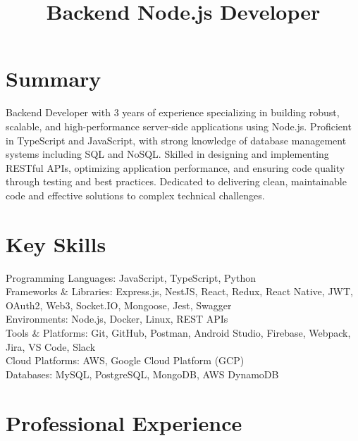 \documentclass[11pt,a4paper]{moderncv}
\title{Backend Node.js Developer}
\begin{document}
\maketitle

\section{Summary}

Backend Developer with 3 years of experience specializing in building robust, scalable, and high-performance server-side applications using Node.js. Proficient in TypeScript and JavaScript, with strong knowledge of database management systems including SQL and NoSQL. Skilled in designing and implementing RESTful APIs, optimizing application performance, and ensuring code quality through testing and best practices. Dedicated to delivering clean, maintainable code and effective solutions to complex technical challenges.

\section{Key Skills}

Programming Languages: JavaScript, TypeScript, Python\\
Frameworks \& Libraries: Express.js, NestJS, React, Redux, React Native, JWT, OAuth2, Web3, Socket.IO, Mongoose, Jest, Swagger\\
Environments: Node.js, Docker, Linux, REST APIs\\
Tools \& Platforms: Git, GitHub, Postman, Android Studio, Firebase, Webpack, Jira, VS Code, Slack\\
Cloud Platforms: AWS, Google Cloud Platform (GCP)\\
Databases: MySQL, PostgreSQL, MongoDB, AWS DynamoDB

\section{Professional Experience}
\end{document}
